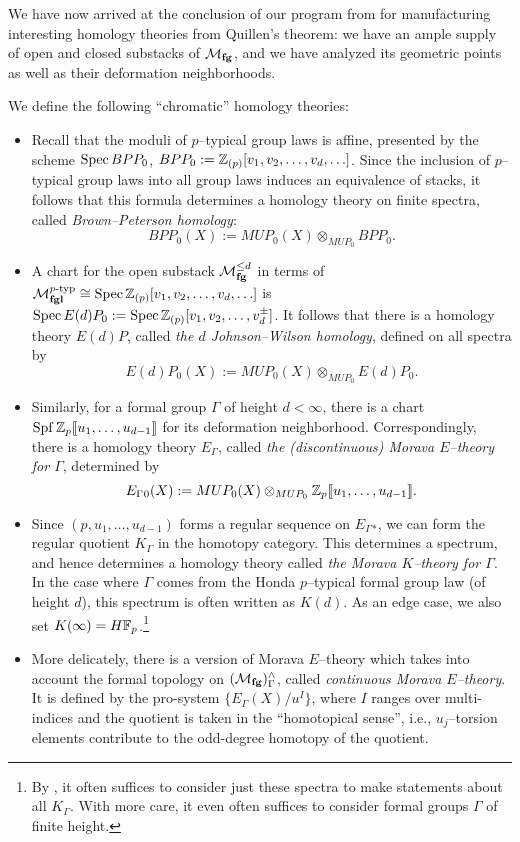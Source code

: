 We have now arrived at the conclusion of our program from  for manufacturing interesting homology theories from Quillen's theorem: we have an ample supply of open and closed substacks of $\mathcal{M}_{\mathbf{fg}}$, and we have analyzed its geometric points as well as their deformation neighborhoods.
\begin{definition}
We define the following ``chromatic'' homology theories:
\begin{itemize}
\item Recall that the moduli of $p$--typical group laws is affine, presented by the scheme $\operatorname{Spec} BPP_0$, $BPP_0 := \mathbb Z_{(p)}[v_1, v_2, \ldots, v_d, \ldots]$.  Since the inclusion of $p$--typical group laws into all group laws induces an equivalence of stacks, it follows that this formula determines a homology theory on finite spectra, called \textit{Brown--Peterson homology}: \[BPP_0(X) := MUP_0(X) \otimes_{MUP_0} BPP_0.\]
\item A chart for the open substack $\mathcal{M}_{\mathbf{fg}}^{\le d}$ in terms of $\mathcal{M}_{\mathbf{fgl}}^{p\text{-}\mathrm{typ}} \cong \operatorname{Spec} \mathbb Z_{(p)}[v_1, v_2, \ldots, v_d, \ldots]$ is $\operatorname{Spec} E(d)P_0 := \operatorname{Spec} \mathbb Z_{(p)}[v_1, v_2, \ldots, v_d^\pm]$.  It follows that there is a homology theory $E(d)P$, called \textit{the $d${\th} Johnson--Wilson homology}, defined on all spectra by \[E(d)P_0(X) := MUP_0(X) \otimes_{MUP_0} E(d)P_0.\]
\item Similarly, for a formal group $\Gamma$ of height $d < \infty$, there is a chart $\operatorname{Spf} \mathbb Z_p\llbracket{u_1, \ldots, u_{d-1}}\rrbracket$ for its deformation neighborhood.  Correspondingly, there is a homology theory $E_\Gamma{}$, called \textit{the (discontinuous) Morava $E$--theory for $\Gamma$}, determined by \[E_\Gamma{}_0(X) := MUP_0(X) \otimes_{MUP_0} \mathbb Z_p\llbracket{u_1, \ldots, u_{d-1}}\rrbracket.\]
\item Since $(p, u_1, \ldots, u_{d-1})$ forms a regular sequence on $E_\Gamma{}_*$, we can form the regular quotient $K_\Gamma$ in the homotopy category.  This determines a spectrum, and hence determines a homology theory called \textit{the Morava $K$--theory for $\Gamma$}.  In the case where $\Gamma$ comes from the Honda $p$--typical formal group law (of height $d$), this spectrum is often written as $K(d)$.  As an edge case, we also set $K(\infty) = H\mathbb F_p$.\footnote{By , it often suffices to consider just these spectra to make statements about all $K_\Gamma$.  With more care, it even often suffices to consider formal groups $\Gamma$ of finite height.}
\item More delicately, there is a version of Morava $E$--theory which takes into account the formal topology on $(\mathcal{M}_{\mathbf{fg}})^\wedge_\Gamma$, called \textit{continuous Morava $E$--theory}.  It is defined by the pro-system $\{E_\Gamma(X) / u^I\}$, where $I$ ranges over multi-indices and the quotient is taken in the ``homotopical sense'', i.e., $u_j$--torsion elements contribute to the odd-degree homotopy of the quotient.

\end{itemize}
\end{definition}
